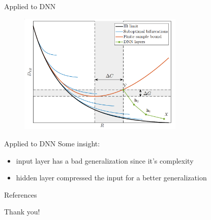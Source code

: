 \documentclass[xcolor={svgnames}]{beamer}
\begin{document}

\begin{frame}{Applied to DNN}
	\begin{figure}[hp]
		\centering
		\includegraphics[width=0.7\textwidth]{figures/info-plane.png}
	\end{figure}
\end{frame}


\begin{frame}{Applied to DNN}
	Some insight:
	\begin{itemize}
		\item input layer has a bad generalization since it's complexity
		\item hidden layer compressed the input for a better generalization
	\end{itemize}
\end{frame}


\begin{frame}[allowframebreaks]{References}
	
	
\end{frame}


\begin{frame}[standout]
  \Huge Thank you!
\end{frame}

\end{document}
